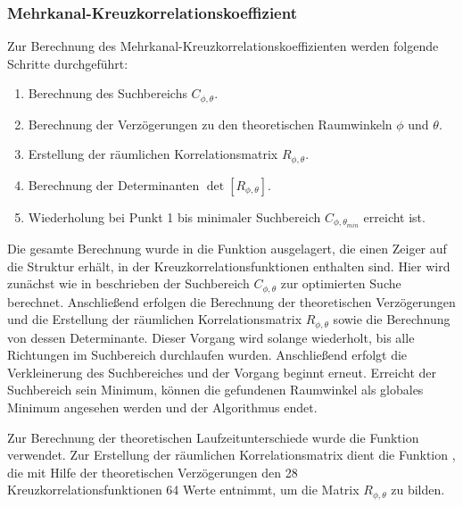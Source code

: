 \subsubsection{Mehrkanal-Kreuzkorrelationskoeffizient}
Zur Berechnung des Mehrkanal-Kreuzkorrelationskoeffizienten werden folgende Schritte durchgeführt:

\begin{enumerate}
    \item Berechnung des Suchbereichs $C_{\phi,\theta}$.
    \item Berechnung der Verzögerungen zu den theoretischen Raumwinkeln $\phi$ und $\theta$.
    \item Erstellung der räumlichen Korrelationsmatrix $R_{\phi,\theta}$.
    \item Berechnung der Determinanten $\det\left[R_{\phi,\theta}\right]$.
    \item Wiederholung bei Punkt 1 bis minimaler Suchbereich $C_{\phi,\theta_{min}}$ erreicht ist. 
\end{enumerate}


Die gesamte Berechnung wurde in die Funktion  ausgelagert, die \ua einen Zeiger auf die Struktur erhält, in der Kreuzkorrelationsfunktionen enthalten sind. Hier wird zunächst wie in  beschrieben der Suchbereich $C_{\phi,\theta}$ zur optimierten Suche berechnet. Anschließend erfolgen die Berechnung der theoretischen Verzögerungen und die Erstellung der räumlichen Korrelationsmatrix $R_{\phi,\theta}$ sowie die Berechnung von dessen Determinante. Dieser Vorgang wird solange wiederholt, bis alle Richtungen im Suchbereich durchlaufen wurden. Anschließend erfolgt die Verkleinerung des Suchbereiches und der Vorgang beginnt erneut. Erreicht der Suchbereich sein Minimum, können die gefundenen Raumwinkel als globales Minimum angesehen werden und der Algorithmus endet.

Zur Berechnung der theoretischen Laufzeitunterschiede wurde die Funktion  verwendet. Zur Erstellung der räumlichen Korrelationsmatrix dient die Funktion , die mit Hilfe der theoretischen Verzögerungen den 28 Kreuzkorrelationsfunktionen 64 Werte entnimmt, um die Matrix $R_{\phi,\theta}$ zu bilden.

